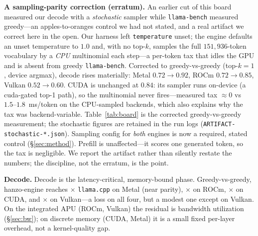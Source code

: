 \documentclass[11pt]{article}
\begin{document}
\textbf{A sampling-parity correction (erratum).} An earlier cut of this board measured our
decode with a \emph{stochastic} sampler while \texttt{llama-bench} measured greedy---an
apples-to-oranges control we had not stated, and a real artifact we correct here in the open.
Our harness left \texttt{temperature} unset; the engine defaults an unset temperature to
\(1.0\) and, with no top-\(k\), samples the full \(151{,}936\)-token vocabulary by a
\emph{CPU} multinomial each step---a per-token tax that idles the GPU and is absent from
greedy \texttt{llama-bench}. Corrected to greedy-vs-greedy (top-\(k{=}1\), device argmax),
decode rises materially: Metal \(0.72\!\to\!0.92\), ROCm \(0.72\!\to\!0.85\), Vulkan
\(0.52\!\to\!0.60\). CUDA is unchanged at \(0.84\): its sampler runs on-device (a cuda-gated
top-1 path), so the multinomial never fires---measured tax \(\approx\!0\) vs
\(1.5\text{--}1.8\)~ms/token on the CPU-sampled backends, which also explains why the tax was
backend-variable. Table~\ref{tab:board} is the corrected greedy-vs-greedy measurement;
the stochastic figures are retained in the run logs (\texttt{ARTIFACT-stochastic-*.json}).
Sampling config for \emph{both} engines is now a required, stated control (\S\ref{sec:method}).
Prefill is unaffected---it scores one generated token, so the tax is negligible. We report the
artifact rather than silently restate the numbers; the discipline, not the erratum, is the point.

\textbf{Decode.} Decode is the latency-critical, memory-bound phase. Greedy-vs-greedy,
hanzo-engine reaches \rMetalDecodeR$\times$ \texttt{llama.cpp} on Metal (near parity),
\rRocmDecodeR$\times$ on ROCm, \rCudaDecodeR$\times$ on CUDA, and \rVulkanDecodeR$\times$ on
Vulkan---a loss on all four, but a modest one except on Vulkan. On the integrated APU
(ROCm, Vulkan) the residual is bandwidth utilization (\S\ref{sec:bw}); on discrete memory
(CUDA, Metal) it is a small fixed per-layer overhead, not a kernel-quality gap.
\end{document}
